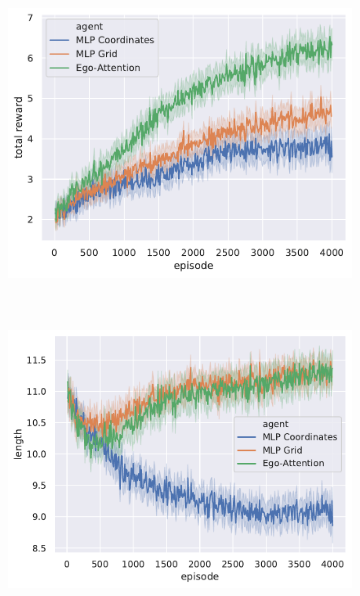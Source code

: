 \documentclass{article}
\begin{document}
\begin{figure}[htp]
	\centering
	\begin{subfigure}[t]{.75\linewidth}
		\centering\includegraphics[width=\linewidth]{img/total_reward}
	\end{subfigure}
\\
	\begin{subfigure}[t]{.49\linewidth}
		\centering\includegraphics[width=\linewidth]{img/length}
	\end{subfigure}
	\begin{subfigure}[t]{.49\linewidth}

\end{subfigure}
\end{figure}
\end{document}

